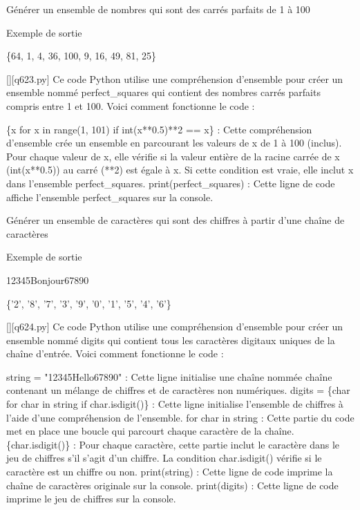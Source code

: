         \question
        Générer un ensemble de nombres qui sont des carrés parfaits de 1 à 100

Exemple de sortie

\{64, 1, 4, 36, 100, 9, 16, 49, 81, 25\}
        \par
        \begin{solution}
            \renewcommand{\nomfichier}{q623.py}
            \pythonfile{\chemincode \nomfichier}[][\nomfichier]
            Ce code Python utilise une compréhension d'ensemble pour créer un ensemble nommé perfect\_squares qui contient des nombres carrés parfaits compris entre 1 et 100. Voici comment fonctionne le code :

    \{x for x in range(1, 101) if int(x**0.5)**2 == x\} : Cette compréhension d'ensemble crée un ensemble en parcourant les valeurs de x de 1 à 100 (inclus). Pour chaque valeur de x, elle vérifie si la valeur entière de la racine carrée de x (int(x**0.5)) au carré (**2) est égale à x. Si cette condition est vraie, elle inclut x dans l'ensemble perfect\_squares.
    print(perfect\_squares) : Cette ligne de code affiche l'ensemble perfect\_squares sur la console.
        \end{solution}
        

        \question
        Générer un ensemble de caractères qui sont des chiffres à partir d'une chaîne de caractères

Exemple de sortie

12345Bonjour67890

\{'2', '8', '7', '3', '9', '0', '1', '5', '4', '6'\}
        \par
        \begin{solution}
            \renewcommand{\nomfichier}{q624.py}
            \pythonfile{\chemincode \nomfichier}[][\nomfichier]
            Ce code Python utilise une compréhension d'ensemble pour créer un ensemble nommé digits qui contient tous les caractères digitaux uniques de la chaîne d'entrée. Voici comment fonctionne le code :

    string = "12345Hello67890" : Cette ligne initialise une chaîne nommée chaîne contenant un mélange de chiffres et de caractères non numériques.
    digits = \{char for char in string if char.isdigit()\} : Cette ligne initialise l'ensemble de chiffres à l'aide d'une compréhension de l'ensemble.
        for char in string : Cette partie du code met en place une boucle qui parcourt chaque caractère de la chaîne.
        \{char.isdigit()\} : Pour chaque caractère, cette partie inclut le caractère dans le jeu de chiffres s'il s'agit d'un chiffre. La condition char.isdigit() vérifie si le caractère est un chiffre ou non.
    print(string) : Cette ligne de code imprime la chaîne de caractères originale sur la console.
    print(digits) : Cette ligne de code imprime le jeu de chiffres sur la console.
        \end{solution}
        

